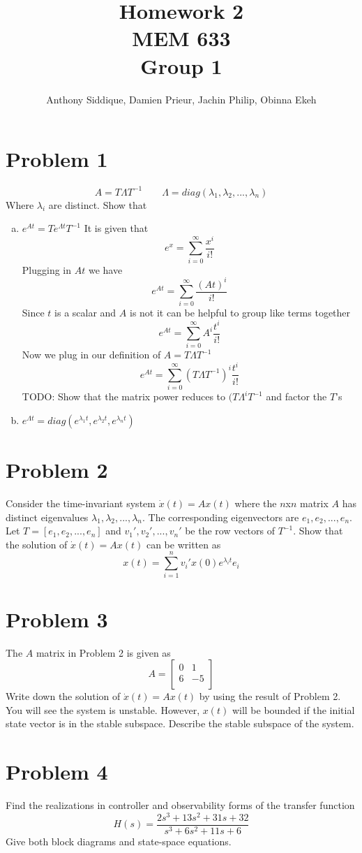 \documentclass{article}
\author{Anthony Siddique, Damien Prieur, Jachin Philip, Obinna Ekeh}
\title{Homework 2\\ MEM 633 \\ Group 1}
\date{}
\begin{document}
\maketitle

\section*{Problem 1}
$$ A = T \Lambda T^{-1} \qquad \Lambda = diag(\lambda_1,\lambda_2, ..., \lambda_n) $$
Where $\lambda_i$ are distinct.
Show that
\begin{enumerate}[(a)]
\item $e^{At} = Te^{\Lambda t}T^{-1}$
\newline
It is given that
$$ e^x = \sum_{i=0}^\infty \frac{x^i}{i!} $$
Plugging in $At$ we have
$$ e^{At} = \sum_{i=0}^\infty \frac{(At)^i}{i!} $$
Since $t$ is a scalar and $A$ is not it can be helpful to group like terms together
$$ e^{At} = \sum_{i=0}^\infty A^i\frac{t^i}{i!} $$
Now we plug in our definition of $A = T \Lambda T^{-1} $
$$ e^{At} = \sum_{i=0}^\infty (T \Lambda T^{-1})^i\frac{t^i}{i!} $$
TODO: Show that the matrix power reduces to $(T \Lambda^i T^{-1}$ and factor the $T$'s


\item $e^{\Lambda t} = diag (e^{\lambda_1 t}, e^{\lambda_2 t}, e^{\lambda_n t})$
\newline

\end{enumerate}

\section*{Problem 2}
Consider the time-invariant system $\dot{x}(t) = Ax(t)$ where the $n$x$n$ matrix $A$ has distinct eigenvalues $\lambda_1, \lambda_2, ..., \lambda_n$.
The corresponding eigenvectors are $e_1, e_2, ...,e_n$.
Let $T = [e_1,e_2,...,e_n]$ and $v_1', v_2',...,v_n'$ be the row vectors of $T^{-1}$.
Show that the solution of $\dot{x}(t)=Ax(t)$ can be written as
$$ x(t) = \sum_{i=1}^n v_i' x(0) e^{\lambda_i t} e_i $$
\newline
\newline

\section*{Problem 3}
The $A$ matrix in Problem 2 is given as
$$ A =
\begin{bmatrix}
0 & 1 \\
6 & -5 \\
\end{bmatrix}
$$
Write down the solution of $\dot{x}(t) = Ax(t)$ by using the result of Problem 2.
You will see the system is unstable.
However, $x(t)$ will be bounded if the initial state vector is in the stable subspace.
Describe the stable subspace of the system.
\newline


\section*{Problem 4}
Find the realizations in controller and observability forms of the transfer function
$$ H(s) = \frac{2s^3+13s^2+31s+32}{s^3+6s^2+11s+6} $$
Give both block diagrams and state-space equations.
\end{document}
